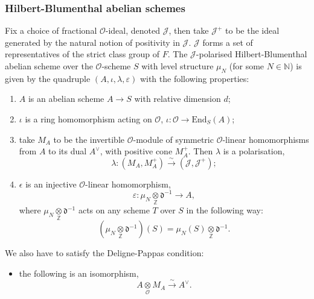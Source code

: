 \documentclass[a4paper,oneside]{amsart}
\theoremstyle{plain}
\theoremstyle{definition}
\begin{document}
\subsubsection{Hilbert-Blumenthal abelian schemes}
Fix a choice of fractional $\mathcal{O}$-ideal, denoted $\mathcal{J}$, then take $\mathcal{J}^+$ to be the ideal generated by the natural notion of positivity in $\mathcal{J}$. $\mathcal{J}$ forms a set of representatives of the strict class group of $F$. The $\mathcal{J}$-polarised Hilbert-Blumenthal abelian scheme over the $\mathcal{O}$-scheme $S$ with level structure $\mu_N$ (for some $N \in \mathbb{N}$) is given by the quadruple $(A, \iota, \lambda, \varepsilon)$ with the following properties:
\begin{enumerate}
    \item $A$ is an abelian scheme $A \rightarrow S$ with relative dimension $d$;
    \item $\iota$ is a ring homomorphism acting on $\mathcal{O}$, $\iota: \mathcal{O} \rightarrow \text{End}_S(A)$;
    \item take $M_A$ to be the invertible $\mathcal{O}$-module of symmetric $\mathcal{O}$-linear homomorphisms from $A$ to its dual $A^\vee$, with positive cone $M_A^+$. Then $\lambda$ is a polarisation,
    \begin{equation*}
        \lambda: (M_A, M_A^+) \xrightarrow{\sim} (\mathcal{J}, \mathcal{J}^+);
    \end{equation*}
    \item $\epsilon$ is an injective $\mathcal{O}$-linear homomorphism,
    \begin{equation*}
        \varepsilon : \mu_N \underset{\mathbb{Z}}{\otimes} \mathfrak{d}^{-1} \rightarrow A,
    \end{equation*}
    where $\mu_N \underset{\mathbb{Z}}{\otimes} \mathfrak{d}^{-1}$ acts on any scheme $T$ over $S$ in the following way:
    \begin{equation*}
        (\mu_N \underset{\mathbb{Z}}{\otimes} \mathfrak{d}^{-1})(S) = \mu_N(S) \underset{\mathbb{Z}}{\otimes} \mathfrak{d}^{-1}.
    \end{equation*}
     
\end{enumerate}
We also have to satisfy the Deligne-Pappas condition:
\begin{itemize}
    \item[(DP)] the following is an isomorphism,
    \begin{equation*}
        A \underset{\mathcal{O}}{\otimes} M_A \xrightarrow{\sim} A^\vee.
    \end{equation*} 
\end{itemize}
\end{document}
